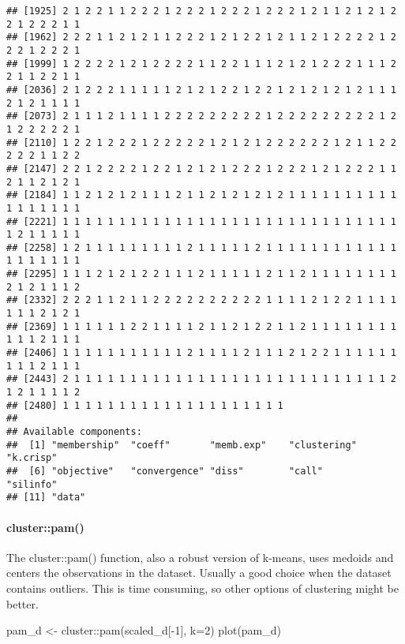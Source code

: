 \documentclass[
]{article}
\newenvironment{Shaded}{\begin{snugshade}}{\end{snugshade}}
\newcommand{\AttributeTok}[1]{\textcolor[rgb]{0.77,0.63,0.00}{#1}}
\newcommand{\DecValTok}[1]{\textcolor[rgb]{0.00,0.00,0.81}{#1}}
\newcommand{\FunctionTok}[1]{\textcolor[rgb]{0.00,0.00,0.00}{#1}}
\newcommand{\NormalTok}[1]{#1}
\newcommand{\OtherTok}[1]{\textcolor[rgb]{0.56,0.35,0.01}{#1}}
\newcommand{\SpecialCharTok}[1]{\textcolor[rgb]{0.00,0.00,0.00}{#1}}
\begin{document}
\begin{verbatim}
## [1925] 2 1 2 2 1 1 2 2 2 1 2 2 2 1 2 2 2 1 2 2 2 1 2 1 1 2 1 2 1 2 2 1 2 2 2 1 1
## [1962] 2 2 2 1 1 2 1 2 1 1 2 2 2 1 2 1 2 2 1 2 1 1 2 1 2 2 2 2 1 2 2 2 1 2 2 2 1
## [1999] 1 2 2 2 2 1 2 1 2 2 2 2 1 1 2 2 1 1 1 2 1 2 1 2 2 2 1 1 1 2 2 1 1 2 2 1 1
## [2036] 2 1 2 2 2 1 1 1 1 1 2 1 2 1 2 2 1 2 2 1 2 1 2 1 2 1 2 1 1 1 2 1 2 1 1 1 1
## [2073] 2 1 1 1 2 1 1 1 1 2 2 2 2 2 2 2 2 2 1 2 2 2 2 2 2 2 2 2 1 2 1 2 2 2 2 2 1
## [2110] 1 2 2 1 2 2 2 1 2 2 2 2 2 1 2 1 2 1 2 2 2 2 2 2 1 2 1 1 2 2 2 2 2 1 1 2 2
## [2147] 2 2 1 2 2 2 2 1 2 2 1 2 1 2 1 2 2 2 1 2 2 2 1 2 1 2 2 2 1 1 2 1 1 2 1 2 1
## [2184] 1 1 2 1 2 1 2 1 1 1 2 1 1 2 1 2 1 2 1 2 1 1 1 1 1 1 1 1 1 1 1 1 1 1 1 1 1
## [2221] 1 1 1 1 1 1 1 1 1 1 1 1 1 1 1 1 1 1 1 1 1 1 1 1 1 1 1 1 1 1 1 2 1 1 1 1 1
## [2258] 1 2 1 1 1 1 1 1 1 1 1 2 1 1 1 1 1 2 1 1 1 1 1 1 1 1 1 1 1 1 1 1 1 1 1 1 1
## [2295] 1 1 1 2 1 2 1 2 2 1 1 1 2 1 1 1 1 1 2 1 1 2 1 1 1 1 1 1 1 1 2 1 2 1 1 1 2
## [2332] 2 2 2 1 1 2 1 1 2 2 2 2 2 2 2 2 2 2 1 1 1 1 2 1 2 2 1 1 1 1 1 1 1 2 1 2 1
## [2369] 1 1 1 1 1 1 2 2 1 1 1 1 2 1 1 2 1 2 2 1 1 2 1 1 1 1 1 1 1 1 1 1 1 2 1 1 1
## [2406] 1 1 1 1 1 1 1 1 1 1 1 2 1 1 1 1 2 1 1 1 2 1 2 2 1 1 1 1 1 1 1 1 1 2 1 1 1
## [2443] 2 1 1 1 1 1 1 1 1 1 1 1 1 1 1 1 1 1 1 1 1 1 1 1 1 1 1 1 1 2 1 2 1 1 1 1 2
## [2480] 1 1 1 1 1 1 1 1 1 1 1 1 1 1 1 1 1 1 1 1
## 
## Available components:
##  [1] "membership"  "coeff"       "memb.exp"    "clustering"  "k.crisp"    
##  [6] "objective"   "convergence" "diss"        "call"        "silinfo"    
## [11] "data"
\end{verbatim}

\hypertarget{clusterpam}{%
\paragraph{cluster::pam()}\label{clusterpam}}

The cluster::pam() function, also a robust version of k-means, uses
medoids and centers the observations in the dataset. Usually a good
choice when the dataset contains outliers. This is time consuming, so
other options of clustering might be better.

\begin{Shaded}
\begin{Highlighting}[]
\NormalTok{pam\_d }\OtherTok{\textless{}{-}}\NormalTok{ cluster}\SpecialCharTok{::}\FunctionTok{pam}\NormalTok{(scaled\_d[}\SpecialCharTok{{-}}\DecValTok{1}\NormalTok{],}
                      \AttributeTok{k=}\DecValTok{2}\NormalTok{)}
\FunctionTok{plot}\NormalTok{(pam\_d)}
\end{Highlighting}
\end{Shaded}
\end{document}
